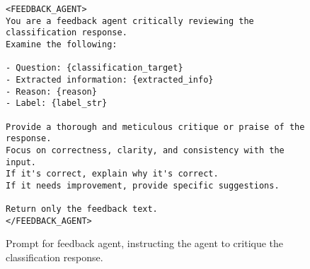 \begin{figure*}[th]
    \centering
    \begin{tcolorbox}[title=Prompt for Feedback Agent on the LLM's self-refinement system]
    \small
        \begin{verbatim}
<FEEDBACK_AGENT>
You are a feedback agent critically reviewing the classification response. 
Examine the following:

- Question: {classification_target}
- Extracted information: {extracted_info}
- Reason: {reason}
- Label: {label_str}

Provide a thorough and meticulous critique or praise of the response. 
Focus on correctness, clarity, and consistency with the input. 
If it's correct, explain why it's correct. 
If it needs improvement, provide specific suggestions.

Return only the feedback text.
</FEEDBACK_AGENT>
        \end{verbatim}
    \end{tcolorbox}
    \caption{Prompt for feedback agent, instructing the agent to critique the classification response.}\label{fig:feedback}
\end{figure*}




